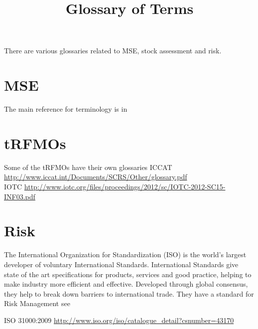 \documentclass[a4paper,10pt]{article}
\title{Glossary of Terms}
\author{}
\begin{document}
\maketitle

There are various glossaries related to MSE, stock assessment and risk.
 
\section{MSE}
  The main reference for terminology is in \href{http://icesjms.oxfordjournals.org/content/64/4/618.abstract}{\cite{rademeyer2007tips}}
  
\section{tRFMOs}

Some of the tRFMOs have their own glossaries
  ICCAT \url{http://www.iccat.int/Documents/SCRS/Other/glossary.pdf}\\
  IOTC  \url{http://www.iotc.org/files/proceedings/2012/sc/IOTC-2012-SC15-INF03.pdf}\\
  
\section{Risk}

  The International Organization for Standardization (ISO) is the world’s largest developer of voluntary International Standards. 
  International Standards give state of the art specifications for products, services and good practice, helping to 
  make industry more efficient and effective. Developed through global consensus, they help to break down barriers to international trade.
  They have a standard for Risk Management see

  ISO 31000:2009 \url{http://www.iso.org/iso/catalogue_detail?csnumber=43170}




\end{document}
